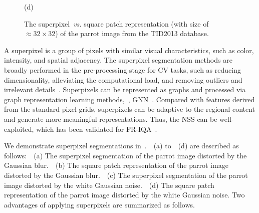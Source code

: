 \begin{figure}[!ht]
\begin{minipage}[t]{.49\linewidth}
			\centerline{(d)}
			\label{PARROT-square-grid-Gaussian-Noise}
		\end{minipage}
		\caption{The superpixel~\emph{vs.} square patch representation (with size of $\approx 32 \times 32$) of the parrot image from the TID2013 database.}
		\label{The superpixel versus square patch of the parrot image from the TID2013 database}
	\end{figure}
	A superpixel is a group of pixels with similar visual characteristics, such as color, intensity, and spatial adjacency. The superpixel segmentation methods are broadly performed in the pre-processing stage for CV tasks, such as reducing dimensionality, alleviating the computational load, and removing outliers and irrelevant details~\citep{achanta2012slic}. Superpixels can be represented as graphs and processed via graph representation learning methods,~\eg, GNN~\citep{Giraldo2022Graph}. Compared with features derived from the standard pixel grids, superpixels can be adaptive to the regional content and generate more meaningful representations. Thus, the NSS can be well-exploited, which has been validated for FR-IQA~\citep{sun2018spsim, 9198131}. 
	
	We demonstrate superpixel segmentations in~.~~(a) to~~(d) are described as follows:~~(a) The superpixel segmentation of the parrot image distorted by the Gaussian blur.~~(b) The square patch representation of the parrot image distorted by the Gaussian blur.~~(c) The superpixel segmentation of the parrot image distorted by the white Gaussian noise.~~(d) The square patch representation of the parrot image distorted by the white Gaussian noise. Two advantages of applying superpixels are summarized as follows.
		
